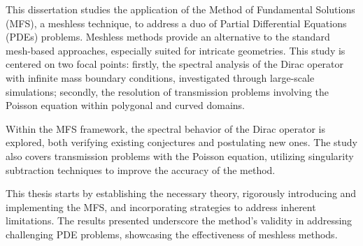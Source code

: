 \acresetall
\noindent
This dissertation studies the application of the Method of Fundamental Solutions (MFS), a meshless technique, to address a duo of Partial Differential Equations (PDEs) problems. Meshless methods provide an alternative to the standard mesh-based approaches, especially suited for intricate geometries. This study is centered on two focal points: firstly, the spectral analysis of the Dirac operator with infinite mass boundary conditions, investigated through large-scale simulations; secondly, the resolution of transmission problems involving the Poisson equation within polygonal and curved domains.

Within the MFS framework, the spectral behavior of the Dirac operator is explored, both verifying existing conjectures and postulating new ones. The study also covers transmission problems with the Poisson equation, utilizing singularity subtraction techniques to improve the accuracy of the method.

This thesis starts by establishing the necessary theory, rigorously introducing and implementing the MFS, and incorporating strategies to address inherent limitations. The results presented underscore the method's validity in addressing challenging PDE problems, showcasing the effectiveness of meshless methods.